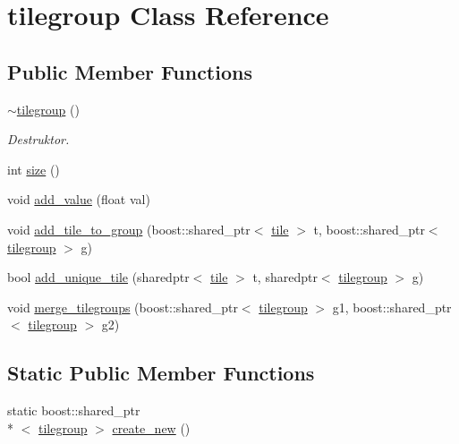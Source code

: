 \hypertarget{classtilegroup}{\section{tilegroup Class Reference}
\label{classtilegroup}
}
\subsection*{Public Member Functions}
\begin{DoxyCompactItemize}
\item 
\hypertarget{classtilegroup_aa6c6f357f5ff2da2c609ec88695256dc}{\hyperlink{classtilegroup_aa6c6f357f5ff2da2c609ec88695256dc}{$\sim$tilegroup} ()}\label{classtilegroup_aa6c6f357f5ff2da2c609ec88695256dc}

\begin{DoxyCompactList}\small\item\em Destruktor. \end{DoxyCompactList}\item 
int \hyperlink{classtilegroup_a77326f80d6ec031a7429f574591cc3ee}{size} ()
\item 
void \hyperlink{classtilegroup_a2c453918b11a2bc1f0cd5f8f7746a5b7}{add\-\_\-value} (float val)
\item 
void \hyperlink{classtilegroup_a79886bd5b038befda291f65d4b7fb63c}{add\-\_\-tile\-\_\-to\-\_\-group} (boost\-::shared\-\_\-ptr$<$ \hyperlink{classtile}{tile} $>$ t, boost\-::shared\-\_\-ptr$<$ \hyperlink{classtilegroup}{tilegroup} $>$ g)
\item 
bool \hyperlink{classtilegroup_acf6c23726967081f2f5094d118a18e8a}{add\-\_\-unique\-\_\-tile} (sharedptr$<$ \hyperlink{classtile}{tile} $>$ t, sharedptr$<$ \hyperlink{classtilegroup}{tilegroup} $>$ g)
\item 
void \hyperlink{classtilegroup_a350ba22f7358323883ebbc917adc5448}{merge\-\_\-tilegroups} (boost\-::shared\-\_\-ptr$<$ \hyperlink{classtilegroup}{tilegroup} $>$ g1, boost\-::shared\-\_\-ptr$<$ \hyperlink{classtilegroup}{tilegroup} $>$ g2)
\end{DoxyCompactItemize}
\subsection*{Static Public Member Functions}
\begin{DoxyCompactItemize}
\item 
static boost\-::shared\-\_\-ptr\\*
$<$ \hyperlink{classtilegroup}{tilegroup} $>$ \hyperlink{classtilegroup_a23c8855f4f61f5932db0eb3b89c1312a}{create\-\_\-new} ()
\end{DoxyCompactItemize}
